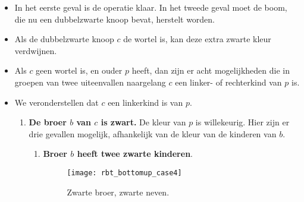 \begin{itemize}
    \item In het eerste geval is de operatie klaar. In het tweede geval moet de boom, die nu een dubbelzwarte knoop bevat, herstelt worden.
    \item Als de dubbelzwarte knoop $c$ de wortel is, kan deze extra zwarte kleur verdwijnen. 
    \item Als $c$ geen wortel is, en ouder $p$ heeft, dan zijn er acht mogelijkheden die in groepen van twee uiteenvallen naargelang $c$ een linker- of rechterkind van $p$ is.
    \item We veronderstellen dat $c$ een linkerkind is van $p$.
    \begin{enumerate}
        \item \textbf{De broer $b$ van $c$ is zwart.} De kleur van $p$ is willekeurig. Hier zijn er drie gevallen mogelijk, afhankelijk van de kleur van de kinderen van $b$.
        \begin{enumerate}
            \item \textbf{Broer $b$ heeft twee zwarte kinderen}.
            \begin{figure}[ht]
                \centering
                \texttt{[image: rbt\_bottomup\_case4]}
                \caption{Zwarte broer, zwarte neven.}
                \label{fig:rbt_bottomup_case4}
            \end{figure}
            \begin{itemize}


\end{itemize}
\end{enumerate}
\end{enumerate}
\end{itemize}
